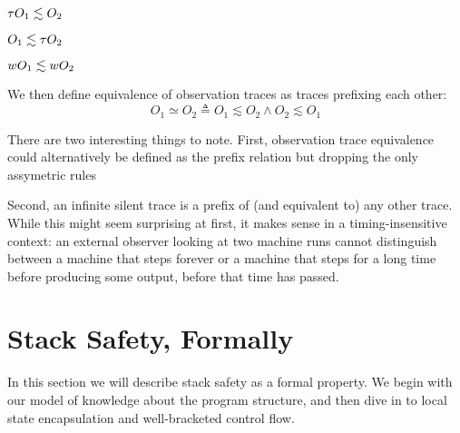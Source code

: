 \documentclass[acmsmall,review,anonymous]{acmart}\settopmatter{printfolios=true,printccs=false,printacmref=false}
\begin{document}
\judgment{}{\(\tau \lesssim \obsT\)}

         {\(\tau O_1 \lesssim O_2\)}

         {\(O_1 \lesssim \tau O_2\)}

         {\(wO_1 \lesssim wO_2\)}


We then define equivalence of observation traces as traces prefixing each other:
\[O_1 \simeq O_2 \triangleq O_1 \lesssim O_2 \land O_2 \lesssim O_1\]

 There are two interesting things
to note.  First, observation trace equivalence could alternatively be
defined as the prefix relation but dropping the only assymetric rules

Second, an infinite silent trace is a prefix of (and equivalent to)
any other trace. While this might seem surprising at first, it makes
sense in a timing-insensitive context: an external observer looking
at two machine runs cannot distinguish between a machine that
steps forever or a machine that steps for a long time before producing
some output, before that time has passed.

%
%

\section{Stack Safety, Formally}
\label{sec:lse-and-wbcf}

In this section we will describe stack safety as a formal property. We
begin with our model of knowledge about the program structure, and then dive in to local state encapsulation and
well-bracketed control flow.
\end{document}
